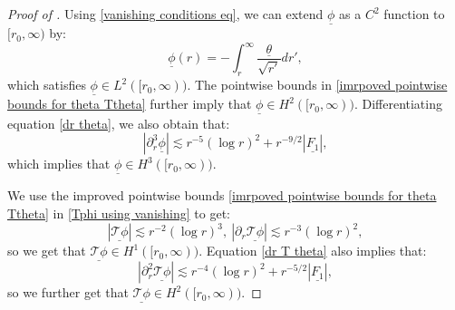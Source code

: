 \documentclass[11pt]{article}
\numberwithin{equation}{section}
\begin{document}
\begin{proof}[Proof of ]
Using \eqref{vanishing conditions eq}, we can extend $\underline{\phi}$ as a $C^2$ function to $[r_0,\infty)$ by:
    \[\underline{\phi}(r)=-\int_r^{\infty}\frac{\underline{\theta}}{\sqrt{r'}}dr',\]
which satisfies $\underline{\phi}\in L^2([r_0,\infty)).$ The pointwise bounds in \eqref{imrpoved pointwise bounds for theta Ttheta} further imply that $\underline{\phi}\in H^2([r_0,\infty)).$ Differentiating equation \eqref{dr theta}, we also obtain that:
\[|\partial_r^3\underline{\phi}|\lesssim r^{-5}(\log r)^2+r^{-9/2}|\underline{F_1}|,\]
which implies that $\underline{\phi}\in H^3([r_0,\infty)).$ 

We use the improved pointwise bounds \eqref{imrpoved pointwise bounds for theta Ttheta} in \eqref{Tphi using vanishing} to get:
\[|\underline{\mathcal{T}\phi}|\lesssim r^{-2}(\log r)^3,\ |\partial_r\underline{\mathcal{T}\phi}|\lesssim r^{-3}(\log r)^2,\]
so we get that $\underline{\mathcal{T}\phi}\in H^1([r_0,\infty)).$ Equation \eqref{dr T theta} also implies that:
\[|\partial_r^2\underline{\mathcal{T}\phi}|\lesssim r^{-4}(\log r)^2+r^{-5/2}|\underline{F_1}|,\]
so we further get that $\underline{\mathcal{T}\phi}\in H^2([r_0,\infty)).$ 


\end{proof}
\end{document}
